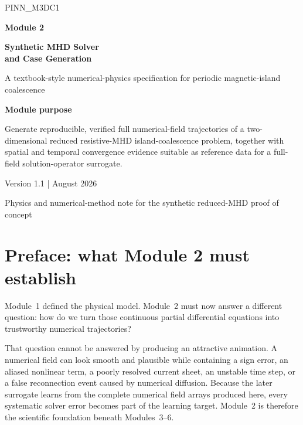 \documentclass[11pt]{article}
\begin{document}
\hypersetup{pageanchor=false}

\begin{titlepage}
\centering
\vspace*{1.15cm}
{\Large\color{AccentTeal} PINN\_M3DC1}\par
\vspace{0.7cm}
{\Huge\bfseries\color{TitleBlue} Module 2}\par
\vspace{0.25cm}
{\LARGE\bfseries\color{TitleBlue} Synthetic MHD Solver\\and Case Generation}\par
\vspace{0.9cm}
{\large A textbook-style numerical-physics specification for periodic magnetic-island coalescence}\par
\vfill
\begin{tcolorbox}[width=0.90\textwidth,colback=SoftBlue,colframe=TitleBlue,arc=2mm]
\centering
\textbf{Module purpose}\par
\vspace{0.35em}
Generate reproducible, verified full numerical-field trajectories of a two-dimensional reduced resistive-MHD island-coalescence problem, together with spatial and temporal convergence evidence suitable as reference data for a full-field solution-operator surrogate.
\end{tcolorbox}
\vfill
{\normalsize Version 1.1 \quad |  August 2026}\par
\vspace{0.25cm}
{\small Physics and numerical-method note for the synthetic reduced-MHD proof of concept}\par
\end{titlepage}

\hypersetup{pageanchor=true}

\section*{Preface: what Module 2 must establish}

Module~1 defined the physical model. Module~2 must now answer a different question: how do we turn those continuous partial differential equations into trustworthy numerical trajectories?

That question cannot be answered by producing an attractive animation. A numerical field can look smooth and plausible while containing a sign error, an aliased nonlinear term, a poorly resolved current sheet, an unstable time step, or a false reconnection event caused by numerical diffusion. Because the later surrogate learns from the complete numerical field arrays produced here, every systematic solver error becomes part of the learning target. Module~2 is therefore the scientific foundation beneath Modules~3--6.
\end{document}
